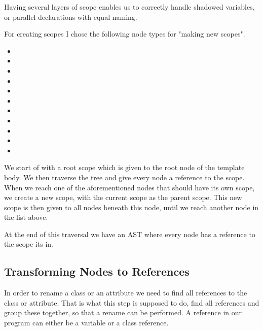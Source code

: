Having several layers of scope enables us to correctly handle shadowed variables, or parallel declarations with equal naming.

For creating scopes I chose the following node types for "making new scopes".

\begin{multicols}{2}
\begin{itemize}
    \item {}
    \item {}
    \item {}
    \item {}
    \item {}
    \item {}
    \item {}
    \item {}
    \item {}
    \item {}
    \item {}
\end{itemize}
\end{multicols}

We start of with a root scope which is given to the root node of the template body.
We then traverse the tree and give every node a reference to the scope.
When we reach one of the aforementioned nodes that should have its own scope, we create a new scope, with the current scope as the parent scope.
This new scope is then given to all nodes beneath this node, until we reach another node in the list above.

At the end of this traversal we have an AST where every node has a reference to the scope its in.

\subsection{Transforming Nodes to References}\label{subsec:transforming-nodes-to-references}

In order to rename a class or an attribute we need to find all references to the class or attribute.
That is what this step is supposed to do, find all references and group these together, so that a rename can be performed.
A reference in our program can either be a variable or a class reference.

